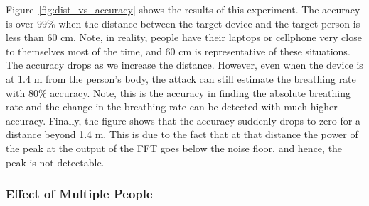 Figure~\ref{fig:dist_vs_accuracy} shows the results of this experiment.  The accuracy is over $99\%$ when the distance between the target device and the target person is less than $60$ cm. Note, in reality, people have their laptops or cellphone very close to themselves most of the time, and $60$ cm is representative of these situations. The accuracy drops as we increase the distance. However, even when the device is at 1.4 m from the person's body, the attack can still estimate the breathing rate with $80\%$ accuracy. Note, this is the accuracy in finding the absolute breathing rate and the change in the breathing rate can be detected with much higher accuracy. Finally, the figure shows that the accuracy suddenly drops to zero for a distance beyond 1.4 m. This is due to the fact that at that distance the power of the peak at the output of the FFT goes below the noise floor, and hence, the peak is not detectable.


\subsubsection{Effect of Multiple People}


